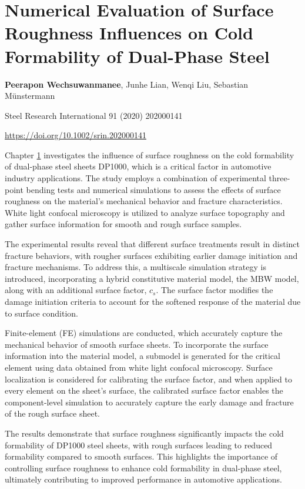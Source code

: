 \chapter[bending]{Numerical Evaluation of Surface Roughness Influences on Cold Formability of Dual-Phase Steel}\label{ch:bending}
\begin{center}

    \textbf{Peerapon Wechsuwanmanee}, Junhe Lian, Wenqi Liu, Sebastian Münstermann
    
    \vspace{20pt}
    
    Steel Research International 91 (2020) 202000141
    
    \vspace{20pt}
    
    \url{https://doi.org/10.1002/srin.202000141}
    
    \vspace{40pt}
    
\end{center}

Chapter \ref{ch:bending} investigates the influence of surface roughness on the cold formability of dual-phase steel sheets DP1000, which is a critical factor in automotive industry applications. The study employs a combination of experimental three-point bending tests and numerical simulations to assess the effects of surface roughness on the material's mechanical behavior and fracture characteristics. White light confocal microscopy is utilized to analyze surface topography and gather surface information for smooth and rough surface samples.

The experimental results reveal that different surface treatments result in distinct fracture behaviors, with rougher surfaces exhibiting earlier damage initiation and fracture mechanisms. To address this, a multiscale simulation strategy is introduced, incorporating a hybrid constitutive material model, the MBW model, along with an additional surface factor, ${c_s}$. The surface factor modifies the damage initiation criteria to account for the softened response of the material due to surface condition.

Finite-element (FE) simulations are conducted, which accurately capture the mechanical behavior of smooth surface sheets. To incorporate the surface information into the material model, a submodel is generated for the critical element using data obtained from white light confocal microscopy. Surface localization is considered for calibrating the surface factor, and when applied to every element on the sheet's surface, the calibrated surface factor enables the component-level simulation to accurately capture the early damage and fracture of the rough surface sheet.

The results demonstrate that surface roughness significantly impacts the cold formability of DP1000 steel sheets, with rough surfaces leading to reduced formability compared to smooth surfaces. This highlights the importance of controlling surface roughness to enhance cold formability in dual-phase steel, ultimately contributing to improved performance in automotive applications. 